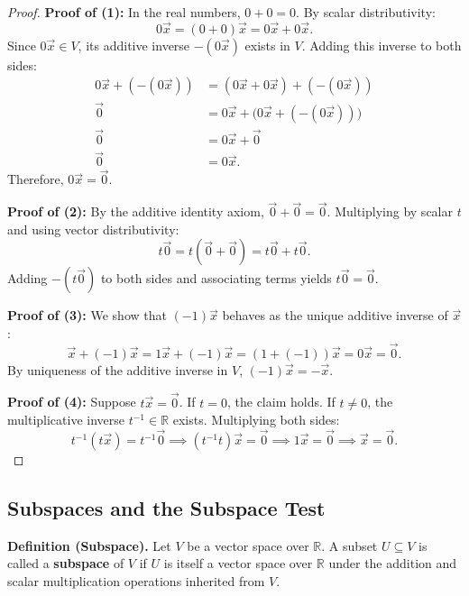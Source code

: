 \bigskip

\begin{proof}
\textbf{Proof of (1):} In the real numbers, $0 + 0 = 0$. By scalar distributivity:
\[
0\vec{x} = (0 + 0)\vec{x} = 0\vec{x} + 0\vec{x}.
\]
Since $0\vec{x} \in V$, its additive inverse $-(0\vec{x})$ exists in $V$. Adding this inverse to both sides:
\begin{align*}
0\vec{x} + (-(0\vec{x})) &= (0\vec{x} + 0\vec{x}) + (-(0\vec{x})) \\
\vec{0} &= 0\vec{x} + \bigl(0\vec{x} + (-(0\vec{x}))\bigr) \\
\vec{0} &= 0\vec{x} + \vec{0} \\
\vec{0} &= 0\vec{x}.
\end{align*}
Therefore, $0\vec{x} = \vec{0}$.

\bigskip
\vspace{0.5em}

\textbf{Proof of (2):} By the additive identity axiom, $\vec{0} + \vec{0} = \vec{0}$. Multiplying by scalar $t$ and using \indent vector distributivity:
\[
t\vec{0} = t(\vec{0} + \vec{0}) = t\vec{0} + t\vec{0}.
\]
\indent Adding $-(t\vec{0})$ to both sides and associating terms yields $t\vec{0} = \vec{0}$.

\bigskip
\vspace{0.5em}

\textbf{Proof of (3):} We show that $(-1)\vec{x}$ behaves as the unique additive inverse of $\vec{x}$:
\[
\vec{x} + (-1)\vec{x} = 1\vec{x} + (-1)\vec{x} = (1 + (-1))\vec{x} = 0\vec{x} = \vec{0}.
\]
\indent By uniqueness of the additive inverse in $V$, $(-1)\vec{x} = -\vec{x}$.

\bigskip
\vspace{0.5em}

\textbf{Proof of (4):} Suppose $t\vec{x} = \vec{0}$. If $t = 0$, the claim holds. If $t \neq 0$, the multiplicative inverse \indent $t^{-1} \in \mathbb{R}$ exists. Multiplying both sides:
\[
t^{-1}(t\vec{x}) = t^{-1}\vec{0} \implies (t^{-1}t)\vec{x} = \vec{0} \implies 1\vec{x} = \vec{0} \implies \vec{x} = \vec{0}.
\]
\end{proof}

\subsection{Subspaces and the Subspace Test}

\noindent\textbf{Definition (Subspace).}
Let $V$ be a vector space over $\mathbb{R}$. A subset $U \subseteq V$ is called a \textbf{subspace} of $V$ if $U$ is itself a vector space over $\mathbb{R}$ under the addition and scalar multiplication operations inherited from $V$.

